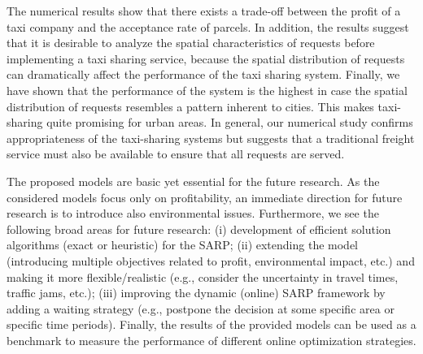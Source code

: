\documentclass[preprint,authoryear,12pt]{elsarticle}
\begin{document}
The numerical results show that there exists a trade-off between the profit of a taxi company and the acceptance rate of parcels. In addition, the results suggest that it is desirable to analyze the spatial characteristics of requests before implementing a taxi sharing service, because the spatial distribution of requests can dramatically affect the performance of the taxi sharing system. Finally, we have shown that the performance of the system is the highest in case the spatial distribution of requests resembles a pattern inherent to cities. This makes taxi-sharing quite promising for urban areas. In general, our numerical study confirms appropriateness of the taxi-sharing systems but suggests that a traditional freight service must also be available to ensure that all requests are served.

The proposed models are basic yet essential for the future research. As the considered models focus only on profitability, an immediate direction for future research is to introduce also environmental issues. Furthermore, we see the following broad areas for future research: (i) development of efficient solution algorithms (exact or heuristic) for the SARP; (ii) extending the model (introducing multiple objectives related to profit, environmental impact, etc.) and making it more flexible/realistic (e.g., consider the uncertainty in travel times, traffic jams, etc.); (iii) improving the dynamic (online) SARP framework by adding a waiting strategy (e.g., postpone the decision at some specific area or specific time periods). Finally, the results of the provided models can be used as a benchmark to measure the performance of different online optimization strategies.



\end{document}
